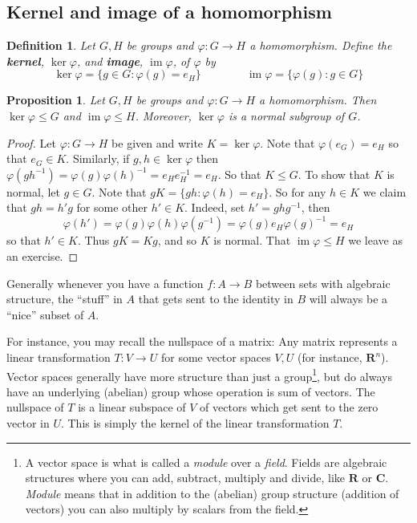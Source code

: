 \documentclass[12pt]{article}
\numberwithin{equation}{subsection}
\newtheorem{prop}[subsection]{Proposition}
\newtheorem{defn}[subsection]{Definition}
\theoremstyle{note}
\newcommand{\img}{\operatorname{im}}
\begin{document}
\subsection{Kernel and image of a homomorphism}

\begin{defn}
	Let $G,H$ be groups and $\varphi\colon G\to H$ a homomorphism. Define the \textbf{kernel}, $\ker{\varphi}$, and \textbf{image}, $\img{\varphi}$, of $\varphi$ by \begin{equation} \ker{\varphi}=\{ g\in G : \varphi(g)=e_H\} \qquad \qquad \img{\varphi}=\{\varphi(g): g\in G\} \end{equation}
	\end{defn}

\begin{prop}\label{ker-is-normal}
Let $G,H$ be groups and $\varphi\colon G\to H$ a homomorphism. Then $\ker{\varphi}\leq G$ and $\img{\varphi}\leq H$.  Moreover, $\ker{\varphi}$ is a normal subgroup of $G$.
\end{prop}

\begin{proof}
	Let $\varphi\colon G\to H$ be given and write $K=\ker \varphi$.  Note that $\varphi(e_G)=e_H$ so that $e_G\in K$. Similarly, if $g,h\in \ker\varphi$ then $\varphi(gh^{-1})=\varphi(g)\varphi(h)^{-1}=e_He_H^{-1}=e_H$. So that $K\leq G$. To show that $K$ is normal, let $g\in G$. Note that $gK=\{gh : \varphi(h)=e_H\}$. So for any $h\in K$ we claim that $gh=h'g$ for some other $h'\in K$. Indeed, set $h'=ghg^{-1}$, then \[\varphi(h')=\varphi(g)\varphi(h)\varphi(g^{-1})=\varphi(g)e_H\varphi(g)^{-1}=e_H\] so that $h'\in K$. Thus $gK=K g$, and so $K$ is normal. That $\img\varphi\leq H$ we leave as an exercise. 
\end{proof}

Generally whenever you have a function $f\colon A\to B$ between sets with algebraic structure, the ``stuff'' in $A$ that gets sent to the identity in $B$ will always be a ``nice'' subset of $A$. 

For instance, you may recall the nullspace of a matrix: Any matrix represents a linear transformation $T\colon V\to U$ for some vector spaces $V,U$ (for instance, $\mathbf{R}^n$). Vector spaces generally have more structure than just a group\footnote{A vector space is what is called a \textit{module} over a \textit{field}. Fields are algebraic structures where you can add, subtract, multiply and divide, like $\mathbf{R}$ or $\mathbf{C}$. \textit{Module} means that in addition to the (abelian) group structure (addition of vectors) you can also multiply by scalars from the field.}, but do always have an underlying (abelian) group whose operation is sum of vectors. The nullspace of $T$ is a linear subspace of $V$ of vectors which get sent to the zero vector in $U$. This is simply the kernel of the linear transformation $T$. 
\end{document}

